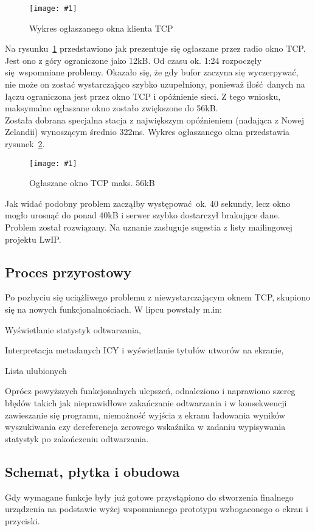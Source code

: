 \documentclass[polish]{aghengthesis}
\let\tempone\itemize
\let\temptwo\enditemize
\renewenvironment{itemize}{\tempone\setlength{\itemsep}{0cm}}{\temptwo}
\newcommand{\imgint}[4]{
	\begin{figure}[{#4}]
		\centering
		\texttt{[image: \#1]}
		\caption{#2}
		\label{#1}
	\end{figure}
}
\newcommand{\imgh}[3]{\imgint{#1}{#2}{#3}{H}}
\begin{document}
			\imgh{4/tcp_fail}{Wykres ogłaszanego okna klienta TCP}{0.85}
			
			Na rysunku~\ref{4/tcp_fail} przedstawiono jak prezentuje się ogłaszane przez radio okno TCP. Jest ono z góry ograniczone jako 12kB. Od czasu ok. 1:24 rozpoczęły się wspomniane problemy. Okazało się, że gdy bufor zaczyna się wyczerpywać, nie może on zostać wystarczająco szybko uzupełniony, ponieważ ilość danych na łączu ograniczona jest przez okno TCP i opóźnienie sieci. Z tego wniosku, maksymalne ogłaszane okno zostało zwiększone do 56kB.
			$ $\\
			
			Została dobrana specjalna stacja z największym opóźnieniem (nadająca z Nowej Zelandii) wynoszącym średnio 322ms. Wykres ogłaszanego okna przedstawia rysunek~\ref{4/tcp_good}.
			
			\imgh{4/tcp_good}{Ogłaszane okno TCP maks. 56kB}{0.6}

			Jak widać podobny problem zacząłby występować ok. 40 sekundy, lecz okno mogło urosnąć do ponad 40kB i serwer szybko dostarczył brakujące dane. Problem został rozwiązany. Na uznanie zasługuje sugestia z listy mailingowej projektu LwIP. %
			
		\subsection{Proces przyrostowy}
			Po pozbyciu się uciążliwego problemu z niewystarczającym oknem TCP, skupiono się na nowych funkcjonalnościach. W lipcu powstały m.in:
			\begin{itemize}
				\item Wyświetlanie statystyk odtwarzania,
				\item Interpretacja metadanych ICY i wyświetlanie tytułów utworów na ekranie,
				\item Lista ulubionych
			\end{itemize}
			
			Oprócz powyższych funkcjonalnych ulepszeń, odnaleziono i naprawiono szereg błędów takich jak nieprawidłowe zakańczanie odtwarzania i w konsekwencji zawieszanie się programu, niemożność wyjścia z ekranu ładowania wyników wyszukiwania czy dereferencja zerowego wskaźnika w zadaniu wypisywania statystyk po zakończeniu odtwarzania.
			
		\subsection{Schemat, płytka i obudowa}
			Gdy wymagane funkcje były już gotowe przystąpiono do stworzenia finalnego urządzenia na podstawie wyżej wspomnianego prototypu wzbogaconego o ekran i przyciski.
			$ $\\
			
\end{document}
